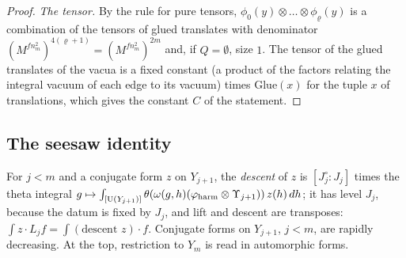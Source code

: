 \begin{proof}
\emph{The tensor.} By the rule for pure tensors, $\phi_0(y)\otimes\dots\otimes\phi_\varrho(y)$ is a combination of the tensors of glued translates with denominator $(M^{fn_m^2})^{4(\varrho+1)}=(M^{fn_m^2})^{2m}$ and, if $Q=\emptyset$, size $1$. The tensor of the glued translates of the vacua is a fixed constant (a product of the factors relating the integral vacuum
of each edge to its vacuum) times $\mathrm{Glue}(x)$ for the tuple $x$ of translations, which gives the constant $C$ of the statement.
\end{proof}

\subsection{The seesaw identity}\label{ss:seesaw-proof}
For $j<m$ and a conjugate form $z$ on $Y_{j+1}$, the \emph{descent} of $z$ is $[J^\circ_j:J_j]$ times the theta integral
$g\mapsto\int_{[\operatorname{U}(Y_{j+1})]}\theta(\omega(g,h)(\varphi_{\rm harm}\otimes\Upsilon_{j+1}))\,z(h)\,dh$; it has level $J_j$, because the datum is fixed by
$J_j$, and lift and descent are transposes: $\int z\cdot L_j f=\int(\text{descent }z)\cdot f$. Conjugate forms on $Y_{j+1}$, $j<m$, are
rapidly decreasing. At the top, restriction to $Y_m$ is read in automorphic forms.

